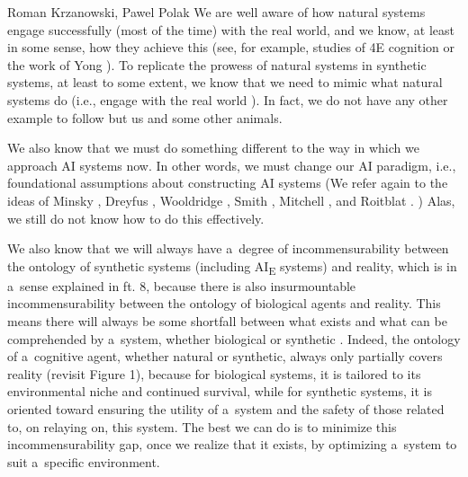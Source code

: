 \begin{artengenv2auth}{Roman Krzanowski, Pawel Polak}
We are well aware of how natural systems engage successfully (most of the time) with the real world, and we know, at least in some sense, how they achieve this (see, for example, studies of 4E cognition
\parencites[][]{shapiro_embodied_2010}[][]{garvey_embodied_2011}[][]{newen_oxford_2020} %
 or the work of Yong 
\parencite*[][]{yong_immense_2022}%
). To replicate the prowess of natural systems in synthetic systems, at least to some extent, we know that we need to mimic what natural systems do (i.e., engage with the real world 
\parencite[see e.g.][]{sarosiek_role_2021}%
). In fact, we do not have any other example to follow but us and some other animals.

We also know that we must do something different to the way in which we approach AI systems now. In other words, we must change our AI paradigm, i.e., foundational assumptions about constructing AI systems (We refer again to the ideas of Minsky
\parencite*[][]{minsky_logical_1991}, %
 Dreyfus 
\parencite*[][]{dreyfus_skillful_2016}, %
 Wooldridge 
\parencite*[][]{wooldridge_road_2021}, %
 Smith 
\parencite*[][]{smith_promise_2019}, %
 Mitchell 
\parencite*[][]{mitchell_artificial_2019}, %
 and Roitblat 
\parencite*[][]{roitblat_algorithms_2020}.%
) Alas, we still do not know how to do this effectively.

We also know that we will always have a~degree of incommensurability between the ontology of synthetic systems (including AI\textsubscript{E} systems) and reality, which is in a~sense explained in ft. 8, because there is also insurmountable incommensurability between the ontology of biological agents and reality. This means there will always be some shortfall between what exists and what can be comprehended by a~system, whether biological or synthetic
\parencite[e.g.,][]{yong_immense_2022}. %
 Indeed, the ontology of a~cognitive agent, whether natural or synthetic, always only partially covers reality (revisit Figure 1), because for biological systems, it is tailored to its environmental niche and continued survival, while for synthetic systems, it is oriented toward ensuring the utility of a~system and the safety of those related to, on relaying on, this system. The best we can do is to minimize this incommensurability gap, once we realize that it exists, by optimizing a~system to suit a~specific environment.


\end{artengenv2auth}
